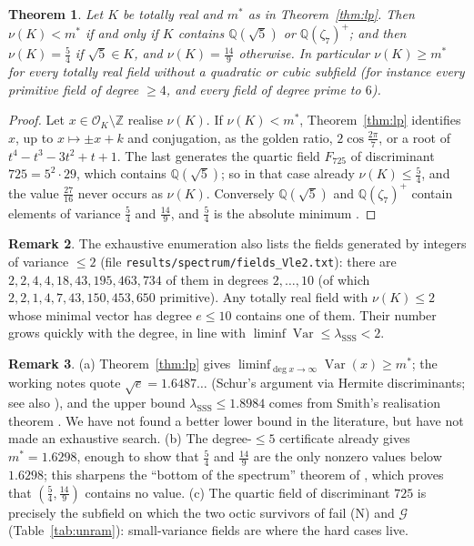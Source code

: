 \documentclass[11pt,reqno]{amsart}
\theoremstyle{plain}
\newtheorem{theorem}{Theorem}[section]
\theoremstyle{definition}
\newtheorem{remark}[theorem]{Remark}
\newcommand{\Z}{\mathbb{Z}}
\newcommand{\Q}{\mathbb{Q}}
\newcommand{\OK}{\mathcal{O}_K}
\newcommand{\Gcl}{\mathcal{G}}
\DeclareMathOperator{\Var}{Var}
\begin{document}
\begin{theorem}\label{thm:smallnu}
Let $K$ be totally real and $m^{*}$ as in Theorem~\ref{thm:lp}. Then $\nu(K)<m^{*}$ if and only if
$K$ contains $\Q(\sqrt5)$ or $\Q(\zeta_7)^{+}$; and then $\nu(K)=\frac54$ if $\sqrt5\in K$, and
$\nu(K)=\frac{14}9$ otherwise. In particular $\nu(K)\ge m^{*}$ for every totally real field without
a quadratic or cubic subfield (for instance every primitive field of degree $\ge4$, and every field
of degree prime to $6$).
\end{theorem}

\begin{proof}
Let $x\in\OK\setminus\Z$ realise $\nu(K)$. If $\nu(K)<m^{*}$, Theorem~\ref{thm:lp} identifies $x$, up
to $x\mapsto\pm x+k$ and conjugation, as the golden ratio, $2\cos\frac{2\pi}7$, or a root of
$t^{4}-t^{3}-3t^{2}+t+1$. The last generates the quartic field $F_{725}$ of discriminant
$725=5^{2}\cdot29$, which contains $\Q(\sqrt5)$; so in that case already $\nu(K)\le\frac54$, and the
value $\frac{27}{16}$ never occurs as $\nu(K)$. Conversely $\Q(\sqrt5)$ and $\Q(\zeta_7)^{+}$ contain
elements of variance $\frac54$ and $\frac{14}9$, and $\frac54$ is the absolute minimum
\cite[sharp floor]{PB}.
\end{proof}

\begin{remark}
The exhaustive enumeration also lists the fields generated by integers of variance $\le2$ (file
\texttt{results/spectrum/fields\_Vle2.txt}): there are $2,2,4,4,18,43,195,463,734$ of them in degrees
$2,\dots,10$ (of which $2,2,1,4,7,43,150,453,650$ primitive). Any totally real field with
$\nu(K)\le2$ whose minimal vector has degree $e\le10$ contains one of them. Their number grows
quickly with the degree, in line with $\liminf\Var\le\lambda_{\mathrm{SSS}}<2$.
\end{remark}

\begin{remark}
(a) Theorem~\ref{thm:lp} gives $\liminf_{\deg x\to\infty}\Var(x)\ge m^{*}$; the working notes
\cite[the limiting-variance theorem]{PB} quote $\sqrt e=1.6487\ldots$ (Schur's argument via Hermite discriminants;
see also \cite{Dubickas,CY}), and the upper bound $\lambda_{\mathrm{SSS}}\le1.8984$ comes from
Smith's realisation theorem \cite{Smith,OSS}. We have not found a better lower bound in the
literature, but have not made an exhaustive search. (b) The degree-$\le5$ certificate already gives
$m^{*}=1.6298$, enough to show that $\frac54$ and $\frac{14}9$ are the only nonzero values below
$1.6298$; this sharpens the ``bottom of the spectrum'' theorem of \cite[bottom of the spectrum]{PB}, which
proves that $(\frac54,\frac{14}9)$ contains no value.
(c) The quartic field of discriminant $725$ is precisely the subfield on which the two octic
survivors of \cite{TwoO} fail (N) and $\Gcl$ (Table~\ref{tab:unram}): small-variance fields are
where the hard cases live.
\end{remark}
\end{document}
